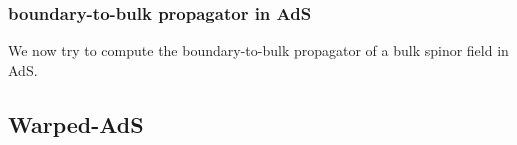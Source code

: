 \documentclass[12pt,a4paper]{article}
\begin{document}
\subsubsection{boundary-to-bulk propagator in AdS}
We now try to compute the boundary-to-bulk propagator of a bulk spinor field in AdS.
\subsection{Warped-AdS}
\end{document}
